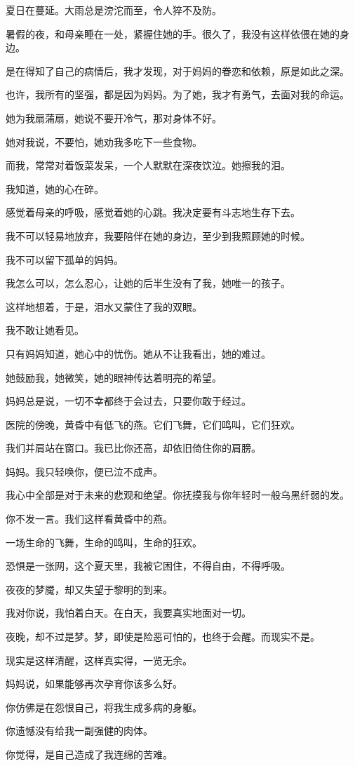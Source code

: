 		\vspace{1em}
		夏日在蔓延。大雨总是滂沱而至，令人猝不及防。\par
		暑假的夜，和母亲睡在一处，紧握住她的手。很久了，我没有这样依偎在她的身边。\par
		是在得知了自己的病情后，我才发现，对于妈妈的眷恋和依赖，原是如此之深。\par
		也许，我所有的坚强，都是因为妈妈。为了她，我才有勇气，去面对我的命运。\par
		她为我扇蒲扇，她说不要开冷气，那对身体不好。\par
		她对我说，不要怕，她劝我多吃下一些食物。\par
		而我，常常对着饭菜发呆，一个人默默在深夜饮泣。她擦我的泪。\par
		我知道，她的心在碎。\par
		感觉着母亲的呼吸，感觉着她的心跳。我决定要有斗志地生存下去。\par
		我不可以轻易地放弃，我要陪伴在她的身边，至少到我照顾她的时候。\par
		我不可以留下孤单的妈妈。\par
		我怎么可以，怎么忍心，让她的后半生没有了我，她唯一的孩子。\par
		这样地想着，于是，泪水又蒙住了我的双眼。\par
		我不敢让她看见。

		\vspace{1em}
		只有妈妈知道，她心中的忧伤。她从不让我看出，她的难过。\par
		她鼓励我，她微笑，她的眼神传达着明亮的希望。\par
		妈妈总是说，一切不幸都终于会过去，只要你敢于经过。\par
		医院的傍晚，黄昏中有低飞的燕。它们飞舞，它们鸣叫，它们狂欢。\par
		我们并肩站在窗口。我已比你还高，却依旧倚住你的肩膀。\par
		妈妈。我只轻唤你，便已泣不成声。\par
		我心中全部是对于未来的悲观和绝望。你抚摸我与你年轻时一般乌黑纤弱的发。\par
		你不发一言。我们这样看黄昏中的燕。\par
		一场生命的飞舞，生命的鸣叫，生命的狂欢。\par
		恐惧是一张网，这个夏天里，我被它困住，不得自由，不得呼吸。\par
		夜夜的梦魇，却又失望于黎明的到来。\par
		我对你说，我怕着白天。在白天，我要真实地面对一切。\par
		夜晚，却不过是梦。梦，即使是险恶可怕的，也终于会醒。而现实不是。\par
		现实是这样清醒，这样真实得，一览无余。\par
		妈妈说，如果能够再次孕育你该多么好。\par
		你仿佛是在怨恨自己，将我生成多病的身躯。\par
		你遗憾没有给我一副强健的肉体。\par
		你觉得，是自己造成了我连绵的苦难。

